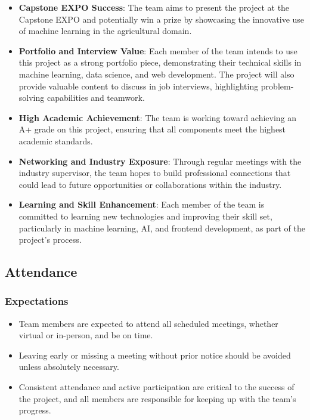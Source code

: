 \documentclass{article}
\begin{document}
\begin{itemize}
    \item \textbf{Capstone EXPO Success}: The team aims to present the project at the Capstone EXPO and potentially win a prize by showcasing the innovative use of machine learning in the agricultural domain.
    
    \item \textbf{Portfolio and Interview Value}: Each member of the team intends to use this project as a strong portfolio piece, demonstrating their technical skills in machine learning, data science, and web development. The project will also provide valuable content to discuss in job interviews, highlighting problem-solving capabilities and teamwork.
    
    \item \textbf{High Academic Achievement}: The team is working toward achieving an A+ grade on this project, ensuring that all components meet the highest academic standards.
    
    \item \textbf{Networking and Industry Exposure}: Through regular meetings with the industry supervisor, the team hopes to build professional connections that could lead to future opportunities or collaborations within the industry.
    
    \item \textbf{Learning and Skill Enhancement}: Each member of the team is committed to learning new technologies and improving their skill set, particularly in machine learning, AI, and frontend development, as part of the project's process.
\end{itemize}


\subsection*{Attendance}

\subsubsection*{Expectations}

\begin{itemize}
    \item Team members are expected to attend all scheduled meetings, whether virtual or in-person, and be on time.
    \item Leaving early or missing a meeting without prior notice should be avoided unless absolutely necessary.
    \item Consistent attendance and active participation are critical to the success of the project, and all members are responsible for keeping up with the team's progress.
\end{itemize}
\end{document}
